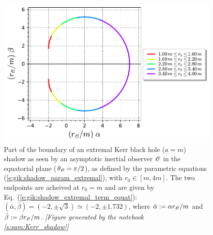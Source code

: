\begin{figure}
\centerline{
\includegraphics[height=0.28\textheight]{gik_shadow_a1_th90_part.pdf} }
\caption[]{\label{f:gik:shadow_a1_th90_part} \footnotesize
Part of the boundary of an extremal Kerr black hole ($a=m$) shadow
as seen by an asymptotic inertial observer $\mathscr{O}$ in the equatorial plane
($\theta_{\mathscr{O}} = \pi/2$), as defined by the
parametric equations (\ref{e:gik:shadow_param_extremal}), with $r_0\in[m, 4m]$.
The two endpoints are acheived at $r_0=m$ and are given by Eq.~(\ref{e:gik:shadow_extremal_term_equat}):
$(\bar{\alpha},\bar{\beta}) = (-2, \pm \sqrt{3}) \simeq (-2, \pm 1.732)$, where
$\bar{\alpha}:= \alpha r_{\mathscr{O}}/m$ and $\bar{\beta}:= \beta r_{\mathscr{O}}/m$.
\textsl{[Figure generated by the notebook \ref{s:sam:Kerr_shadow}]}
}
\end{figure}

